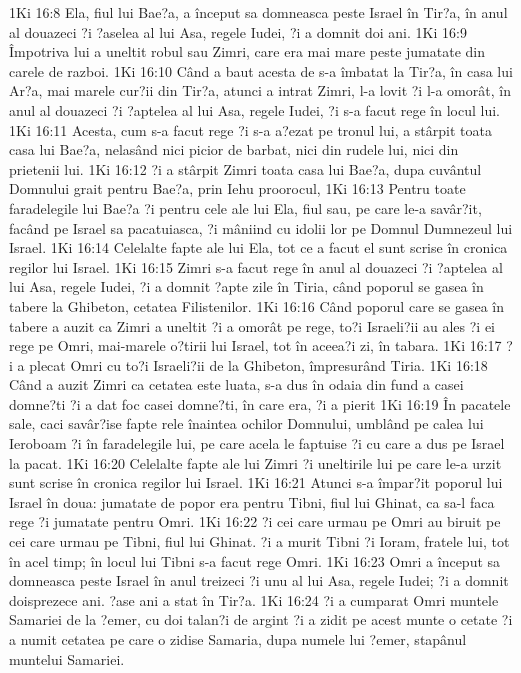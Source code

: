 1Ki 16:8  Ela, fiul lui Bae?a, a început sa domneasca peste Israel în Tir?a, în anul al douazeci ?i ?aselea al lui Asa, regele Iudei, ?i a domnit doi ani.
1Ki 16:9  Împotriva lui a uneltit robul sau Zimri, care era mai mare peste jumatate din carele de razboi.
1Ki 16:10  Când a baut acesta de s-a îmbatat la Tir?a, în casa lui Ar?a, mai marele cur?ii din Tir?a, atunci a intrat Zimri, l-a lovit ?i l-a omorât, în anul al douazeci ?i ?aptelea al lui Asa, regele Iudei, ?i s-a facut rege în locul lui.
1Ki 16:11  Acesta, cum s-a facut rege ?i s-a a?ezat pe tronul lui, a stârpit toata casa lui Bae?a, nelasând nici picior de barbat, nici din rudele lui, nici din prietenii lui.
1Ki 16:12  ?i a stârpit Zimri toata casa lui Bae?a, dupa cuvântul Domnului grait pentru Bae?a, prin Iehu proorocul,
1Ki 16:13  Pentru toate faradelegile lui Bae?a ?i pentru cele ale lui Ela, fiul sau, pe care le-a savâr?it, facând pe Israel sa pacatuiasca, ?i mâniind cu idolii lor pe Domnul Dumnezeul lui Israel.
1Ki 16:14  Celelalte fapte ale lui Ela, tot ce a facut el sunt scrise în cronica regilor lui Israel.
1Ki 16:15  Zimri s-a facut rege în anul al douazeci ?i ?aptelea al lui Asa, regele Iudei, ?i a domnit ?apte zile în Tiria, când poporul se gasea în tabere la Ghibeton, cetatea Filistenilor.
1Ki 16:16  Când poporul care se gasea în tabere a auzit ca Zimri a uneltit ?i a omorât pe rege, to?i Israeli?ii au ales ?i ei rege pe Omri, mai-marele o?tirii lui Israel, tot în aceea?i zi, în tabara.
1Ki 16:17  ?i a plecat Omri cu to?i Israeli?ii de la Ghibeton, împresurând Tiria.
1Ki 16:18  Când a auzit Zimri ca cetatea este luata, s-a dus în odaia din fund a casei domne?ti ?i a dat foc casei domne?ti, în care era, ?i a pierit
1Ki 16:19  În pacatele sale, caci savâr?ise fapte rele înaintea ochilor Domnului, umblând pe calea lui Ieroboam ?i în faradelegile lui, pe care acela le faptuise ?i cu care a dus pe Israel la pacat.
1Ki 16:20  Celelalte fapte ale lui Zimri ?i uneltirile lui pe care le-a urzit sunt scrise în cronica regilor lui Israel.
1Ki 16:21  Atunci s-a împar?it poporul lui Israel în doua: jumatate de popor era pentru Tibni, fiul lui Ghinat, ca sa-l faca rege ?i jumatate pentru Omri.
1Ki 16:22  ?i cei care urmau pe Omri au biruit pe cei care urmau pe Tibni, fiul lui Ghinat. ?i a murit Tibni ?i Ioram, fratele lui, tot în acel timp; în locul lui Tibni s-a facut rege Omri.
1Ki 16:23  Omri a început sa domneasca peste Israel în anul treizeci ?i unu al lui Asa, regele Iudei; ?i a domnit doisprezece ani. ?ase ani a stat în Tir?a.
1Ki 16:24  ?i a cumparat Omri muntele Samariei de la ?emer, cu doi talan?i de argint ?i a zidit pe acest munte o cetate ?i a numit cetatea pe care o zidise Samaria, dupa numele lui ?emer, stapânul muntelui Samariei.
